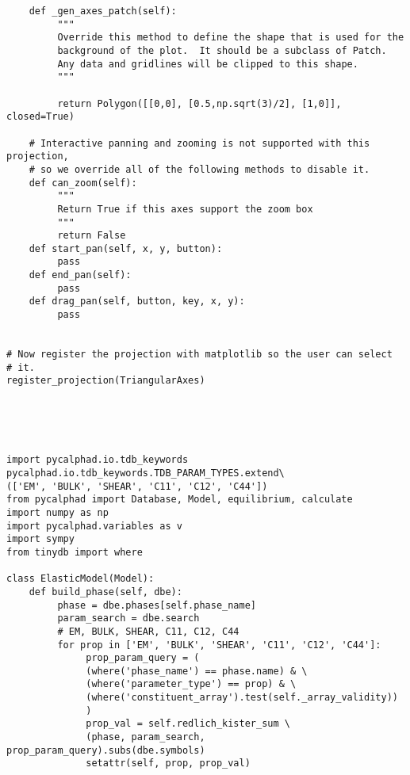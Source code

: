 {\begin{lstlisting}
    def _gen_axes_patch(self):
         """
         Override this method to define the shape that is used for the
         background of the plot.  It should be a subclass of Patch.
         Any data and gridlines will be clipped to this shape.
         """

         return Polygon([[0,0], [0.5,np.sqrt(3)/2], [1,0]], closed=True)

    # Interactive panning and zooming is not supported with this projection,
    # so we override all of the following methods to disable it.
    def can_zoom(self):
         """
         Return True if this axes support the zoom box
         """
         return False
    def start_pan(self, x, y, button):
         pass
    def end_pan(self):
         pass
    def drag_pan(self, button, key, x, y):
         pass


# Now register the projection with matplotlib so the user can select
# it.
register_projection(TriangularAxes)





import pycalphad.io.tdb_keywords
pycalphad.io.tdb_keywords.TDB_PARAM_TYPES.extend\
(['EM', 'BULK', 'SHEAR', 'C11', 'C12', 'C44'])
from pycalphad import Database, Model, equilibrium, calculate
import numpy as np
import pycalphad.variables as v
import sympy
from tinydb import where

class ElasticModel(Model):
    def build_phase(self, dbe):
         phase = dbe.phases[self.phase_name]
         param_search = dbe.search
         # EM, BULK, SHEAR, C11, C12, C44
         for prop in ['EM', 'BULK', 'SHEAR', 'C11', 'C12', 'C44']:
              prop_param_query = (
              (where('phase_name') == phase.name) & \
              (where('parameter_type') == prop) & \
              (where('constituent_array').test(self._array_validity))
              )
              prop_val = self.redlich_kister_sum \
              (phase, param_search, prop_param_query).subs(dbe.symbols)
              setattr(self, prop, prop_val)






\end{lstlisting}}
